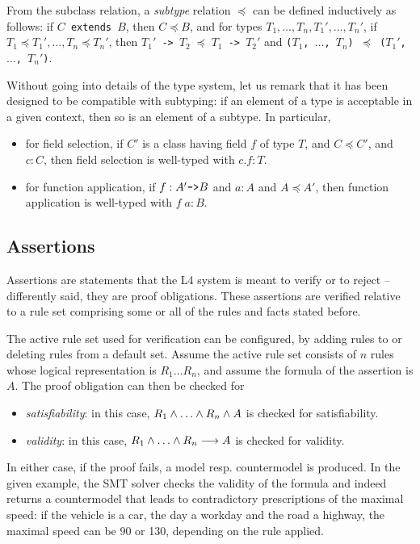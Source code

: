 From the subclass relation, a \emph{subtype} relation $\preceq$ can be defined
inductively as follows: if \texttt{$C$ extends $B$}, then $C \preceq B$, and
for types $T_1, \dots, T_n, T_1', \dots, T_n'$,
if $T_1 \preceq T_1', \dots, T_n \preceq T_n'$, 
then \texttt{$T_1'$ -> $T_2 \; \preceq \; T_1$ -> $T_2'$} 
and \texttt{($T_1$, $\dots$, $T_n$) $\preceq$ ($T_1'$, $\dots$, $T_n'$)}.

Without going into details of the type system, let us remark that it has been
designed to be compatible with subtyping: if an element of a type is
acceptable in a given context, then so is an element of a subtype. In
particular,
\begin{itemize}
\item for field selection, if $C'$ is a class having field $f$ of type $T$,
  and $C \preceq C'$, and $c : C$, then field selection is well-typed with $c.f : T$.
\item for function application, if $f: A' \mbox{\texttt{->}} B$ and $a:A$ and
  $A \preceq A'$, then function application is well-typed with $f\; a : B$.
\end{itemize}



\subsection{Assertions}\label{sec:assertions}


Assertions are statements that the L4 system is meant to verify or to
reject -- differently said, they are proof obligations. These assertions are verified
relative to a rule set comprising some or all of the rules and facts stated
before. 


The active rule set used for verification can be configured, by adding rules
to or deleting rules from a default set. Assume the active rule set consists
of $n$ rules whose logical representation is $R_1 \dots R_n$, and assume the
formula of the assertion is $A$. The proof obligation can then be checked for
\begin{itemize}
\item  \emph{satisfiability}: in this case, $R_1 \AND \dots \AND R_n \AND A$
  is checked for satisfiability.
\item \emph{validity}: in this case, $R_1 \AND \dots \AND R_n \IMPL A$ is
  checked for validity.
\end{itemize}
In either case, if the proof fails, a model resp.{} countermodel is produced.
In the given example, the SMT solver checks the validity of the formula and
indeed returns a countermodel that leads to contradictory prescriptions of the
maximal speed: if the vehicle is a car, the day a workday and the road a
highway, the maximal speed can be 90 or 130, depending on the rule applied.


